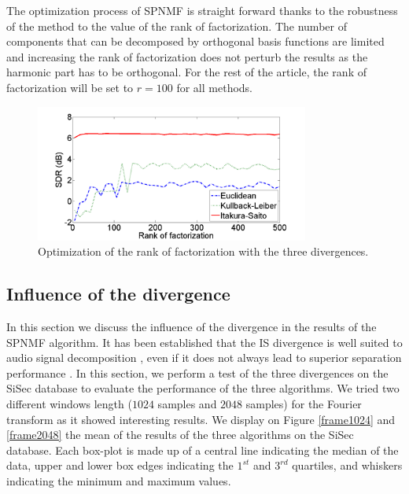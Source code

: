 \documentclass[journal]{IEEEtran}
\begin{document}
The optimization process of SPNMF is straight forward thanks to the robustness of the method to the value of the rank of factorization. The number of components that can be decomposed by orthogonal basis functions are limited and increasing the rank of factorization does not perturb the results as the harmonic part has to be orthogonal. For the rest of the article, the rank of factorization will be set to $r=100$ for all methods.



\begin{figure}[htb]

  \centering 
  \includegraphics[width=9cm]{fig/RankOfFact.png}
  \caption{\label{RankOfFact} Optimization of the rank of factorization with the three divergences.}
  
\end{figure}




\subsection{Influence of the divergence}\label{setup:divergence}

In this section we discuss the influence of the divergence in the results of the SPNMF algorithm. It has been established that the IS divergence is well suited to audio signal decomposition \cite{gray1980distortion}, even if it does not always lead to superior separation performance \cite{canadas2014percussive}. In this section, we perform a test of the three divergences on the SiSec database to evaluate the performance of the three algorithms. We tried two different windows length ($1024$ samples and $2048$ samples) for the Fourier transform as it showed interesting results. We display on Figure \ref{frame1024} and \ref{frame2048} the mean of the results of the three algorithms on the SiSec database. Each box-plot is made up of a central line indicating the median of the data, upper and lower box edges indicating the $1^{st}$ and $3^{rd}$ quartiles, and whiskers indicating the minimum and maximum values. 
\end{document}
